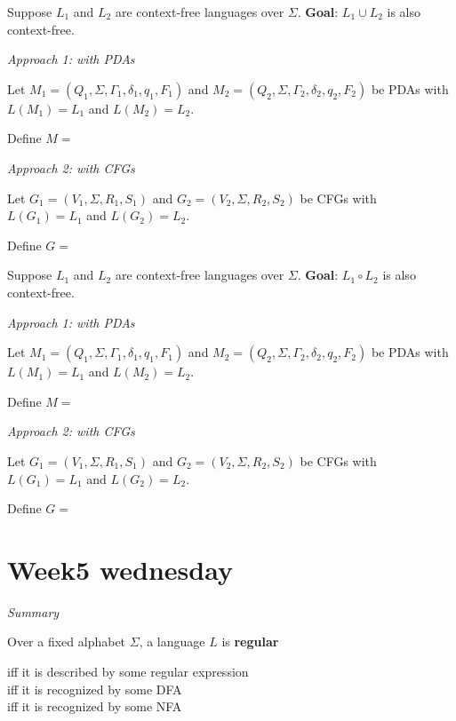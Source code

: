 \documentclass[12pt, oneside]{article}
\begin{document}
\vfill

\newpage
Suppose $L_1$ and $L_2$ are context-free languages over $\Sigma$.  {\bf Goal}:  $L_1 \cup L_2$  is  also context-free.

{\it Approach 1: with  PDAs}

Let $M_1 = ( Q_1, \Sigma, \Gamma_1, \delta_1, q_1, F_1)$ and
$M_2 = ( Q_2, \Sigma, \Gamma_2, \delta_2, q_2, F_2)$ be PDAs with 
$L(M_1) =  L_1$  and  $L(M_2) = L_2$.

Define $M = $

\vfill

{\it Approach  2: with CFGs}

Let $G_1 = (V_1, \Sigma, R_1, S_1)$  and   $G_2 = (V_2, \Sigma, R_2, S_2)$  be CFGs  with
$L(G_1) =  L_1$  and  $L(G_2) = L_2$.

Define $G = $

\vfill

\newpage
Suppose $L_1$ and $L_2$ are context-free languages over $\Sigma$.  {\bf Goal}:  $L_1 \circ L_2$  is  also context-free.


{\it Approach 1: with  PDAs}

Let $M_1 = ( Q_1, \Sigma, \Gamma_1, \delta_1, q_1, F_1)$ and
$M_2 = ( Q_2, \Sigma, \Gamma_2, \delta_2, q_2, F_2)$ be PDAs with 
$L(M_1) =  L_1$  and  $L(M_2) = L_2$.

Define $M = $

\vfill

{\it Approach  2: with CFGs}

Let $G_1 = (V_1, \Sigma, R_1, S_1)$  and   $G_2 = (V_2, \Sigma, R_2, S_2)$  be CFGs  with
$L(G_1) =  L_1$  and  $L(G_2) = L_2$.

Define $G = $

\vfill

 \vfill
\section*{Week5 wednesday}


{\it Summary}

Over a fixed alphabet $\Sigma$, a language $L$ is {\bf regular}

\vspace{-20pt}
\begin{center}
    iff it is described by some regular expression \\
    iff it is recognized by some DFA\\
    iff it is recognized by some NFA
\end{center}
\end{document}

